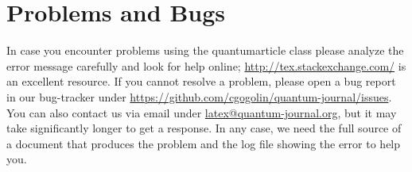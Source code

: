 \documentclass[a4paper,twocolumn,superscriptaddress,11pt,accepted=2017-05-09]{quantumarticle}
\begin{document}
\section{Problems and Bugs}
In case you encounter problems using the quantumarticle class please analyze the error message carefully and look for help online; \href{http://tex.stackexchange.com/}{http://tex.stackexchange.com/} is an excellent resource.
If you cannot resolve a problem, please open a bug report in our bug-tracker under \href{https://github.com/cgogolin/quantum-journal/issues}{https://github.com/cgogolin/quantum-journal/issues}.
You can also contact us via email under \href{mailto:latex@quantum-journal.org}{latex@quantum-journal.org}, but it may take significantly longer to get a response.
In any case, we need the full source of a document that produces the problem and the log file showing the error to help you.
\end{document}
